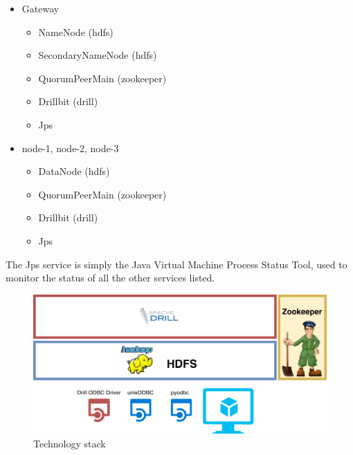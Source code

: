 \documentclass[a4paper,english]{report}
\begin{document}
			\begin{itemize}
				\item Gateway
				\begin{itemize}
					\item NameNode (hdfs)
					\item SecondaryNameNode (hdfs)
					\item QuorumPeerMain (zookeeper)
					\item Drillbit (drill)
					\item Jps
				\end{itemize}
				\item node-1, node-2, node-3
				\begin{itemize}
					\item DataNode (hdfs)
					\item QuorumPeerMain (zookeeper)
					\item Drillbit (drill)
					\item Jps
				\end{itemize}
			\end{itemize}
			The Jps service is simply the Java Virtual Machine Process Status Tool, used to monitor the status of all the other services listed.
			\begin{figure}[h]
				\includegraphics[width=\textwidth]{tech_stack}
				\caption{Technology stack}
			\end{figure}
		\clearpage
\end{document}
